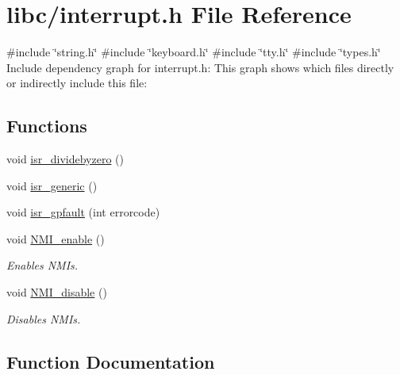 \hypertarget{a00020}{}\section{libc/interrupt.h File Reference}
\label{a00020}
{\ttfamily \#include \char`\"{}string.\+h\char`\"{}}\newline
{\ttfamily \#include \char`\"{}keyboard.\+h\char`\"{}}\newline
{\ttfamily \#include \char`\"{}tty.\+h\char`\"{}}\newline
{\ttfamily \#include \char`\"{}types.\+h\char`\"{}}\newline
Include dependency graph for interrupt.\+h\+:
This graph shows which files directly or indirectly include this file\+:
\subsection*{Functions}
\begin{DoxyCompactItemize}
\item 
void \hyperlink{a00020_a1fd242da8c9498b98d978e150a36c23f_a1fd242da8c9498b98d978e150a36c23f}{isr\+\_\+dividebyzero} ()
\item 
void \hyperlink{a00020_a13f7b685594468a92abb85e03148fb54_a13f7b685594468a92abb85e03148fb54}{isr\+\_\+generic} ()
\item 
void \hyperlink{a00020_af6ac5b24d3c1b69d4272012baa895291_af6ac5b24d3c1b69d4272012baa895291}{isr\+\_\+gpfault} (int errorcode)
\item 
void \hyperlink{a00020_adecc6bfc28b1d14005a070b0159c8225_adecc6bfc28b1d14005a070b0159c8225}{N\+M\+I\+\_\+enable} ()
\begin{DoxyCompactList}\small\item\em Enables N\+MI\textquotesingle{}s. \end{DoxyCompactList}\item 
void \hyperlink{a00020_a03a1497db52d629138dba59ddafcbc32_a03a1497db52d629138dba59ddafcbc32}{N\+M\+I\+\_\+disable} ()
\begin{DoxyCompactList}\small\item\em Disables N\+MI\textquotesingle{}s. \end{DoxyCompactList}\end{DoxyCompactItemize}


\subsection{Function Documentation}
\mbox{\label{a00020_a1fd242da8c9498b98d978e150a36c23f_a1fd242da8c9498b98d978e150a36c23f}} 
